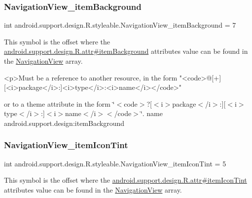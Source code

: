 \subsubsection{\texorpdfstring{Navigation\+View\+\_\+item\+Background}{NavigationView\_itemBackground}}
{\footnotesize\ttfamily int android.\+support.\+design.\+R.\+styleable.\+Navigation\+View\+\_\+item\+Background = 7\hspace{0.3cm}{\ttfamily [static]}}

This symbol is the offset where the \hyperlink{classandroid_1_1support_1_1design_1_1R_1_1attr_a175ad4ea5ea9131efdf6e243d576e059}{android.\+support.\+design.\+R.\+attr\#item\+Background} attribute\textquotesingle{}s value can be found in the \hyperlink{classandroid_1_1support_1_1design_1_1R_1_1styleable_a277c199f371e8804c26e2cd6dbf88999}{Navigation\+View} array.

\begin{DoxyVerb}      <p>Must be a reference to another resource, in the form "<code>@[+][<i>package</i>:]<i>type</i>:<i>name</i></code>"
\end{DoxyVerb}
 or to a theme attribute in the form \char`\"{}$<$code$>$?\mbox{[}$<$i$>$package$<$/i$>$\+:\mbox{]}\mbox{[}$<$i$>$type$<$/i$>$\+:\mbox{]}$<$i$>$name$<$/i$>$$<$/code$>$\char`\"{}.  name android.\+support.\+design\+:item\+Background \mbox{\label{classandroid_1_1support_1_1design_1_1R_1_1styleable_ab2caef989041576424f200206e9224b3}} 
\subsubsection{\texorpdfstring{Navigation\+View\+\_\+item\+Icon\+Tint}{NavigationView\_itemIconTint}}
{\footnotesize\ttfamily int android.\+support.\+design.\+R.\+styleable.\+Navigation\+View\+\_\+item\+Icon\+Tint = 5\hspace{0.3cm}{\ttfamily [static]}}

This symbol is the offset where the \hyperlink{classandroid_1_1support_1_1design_1_1R_1_1attr_a7020010c833f10c1e8fdba0f874a350f}{android.\+support.\+design.\+R.\+attr\#item\+Icon\+Tint} attribute\textquotesingle{}s value can be found in the \hyperlink{classandroid_1_1support_1_1design_1_1R_1_1styleable_a277c199f371e8804c26e2cd6dbf88999}{Navigation\+View} array.

